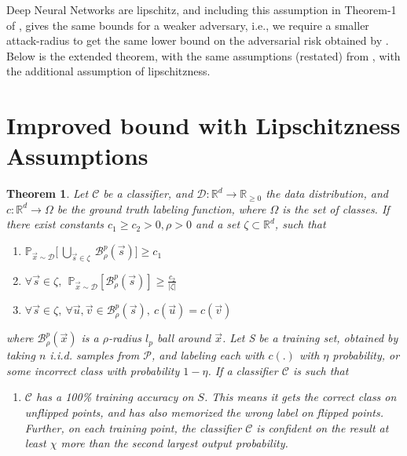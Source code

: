 \documentclass[12pt, oneside]{book}
\newtheorem{theorem}{Theorem}
\begin{document}
Deep Neural Networks are lipschitz, and including this assumption in Theorem-1
of \citep{sanyal2021how}, gives the same bounds for a weaker adversary, i.e., we
require a smaller attack-radius to get the same lower bound on the adversarial
risk obtained by \citep{sanyal2021how}. Below is the extended theorem, with the
same assumptions (restated) from \citep{sanyal2021how}, with the additional
assumption of lipschitzness.

\section{Improved bound with Lipschitzness Assumptions}
\begin{theorem}
    \label{theorem:lipschitzness-extension}
    Let $\mathcal{C}$ be a classifier, and $\mathcal{D}: \mathbb{R}^d \to
    \mathbb{R}_{\geq 0}$ the data distribution, and $c: \mathbb{R}^d \to \Omega$
    be the ground truth labeling function, where $\Omega$ is the set of classes.
    If there exist constants $c_1 \geq c_2 > 0, \rho > 0$ and a set $\zeta
    \subset \mathbb{R}^d$, such that
    \begin{enumerate}
        \item $\mathbb{P}_{\vec{x} \sim \mathcal{D}} \bigg [~\underset{\vec{s}
        \in \zeta}{\bigcup}~\mathcal{B}_\rho^p(\vec{s}) \bigg ] \geq c_1$
        \item $\forall \vec{s} \in \zeta,~~ \mathbb{P}_{\vec{x} \sim
        \mathcal{D}} [\mathcal{B}_\rho^p(\vec{s})] \geq \frac{c_2}{|\zeta|}$
        \item $\forall \vec{s} \in \zeta,~\forall \vec{u}, \vec{v} \in
        \mathcal{B}_\rho^p(\vec{s}),~c(\vec{u}) = c(\vec{v})$
    \end{enumerate}
    where $\mathcal{B}^p_\rho(\vec{x})$ is a $\rho$-radius $l_p$ ball around
    $\vec{x}$. Let S be a training set, obtained by taking $n$ i.i.d. samples
    from $\mathcal{P}$, and labeling each with $c(.)$ with $\eta$ probability,
    or some incorrect class with probability $1-\eta$. If a classifier
    $\mathcal{C}$ is such that 
    \begin{enumerate}
        \item $\mathcal{C}$ has a 100\% training accuracy on $S$. This means it
        gets the correct class on unflipped points, and has also memorized the
        wrong label on flipped points. Further, on each training point, the
        classifier $\mathcal{C}$ is confident on the result at least $\chi$ more
        than the second largest output probability.

\end{enumerate}
\end{theorem}
\end{document}
